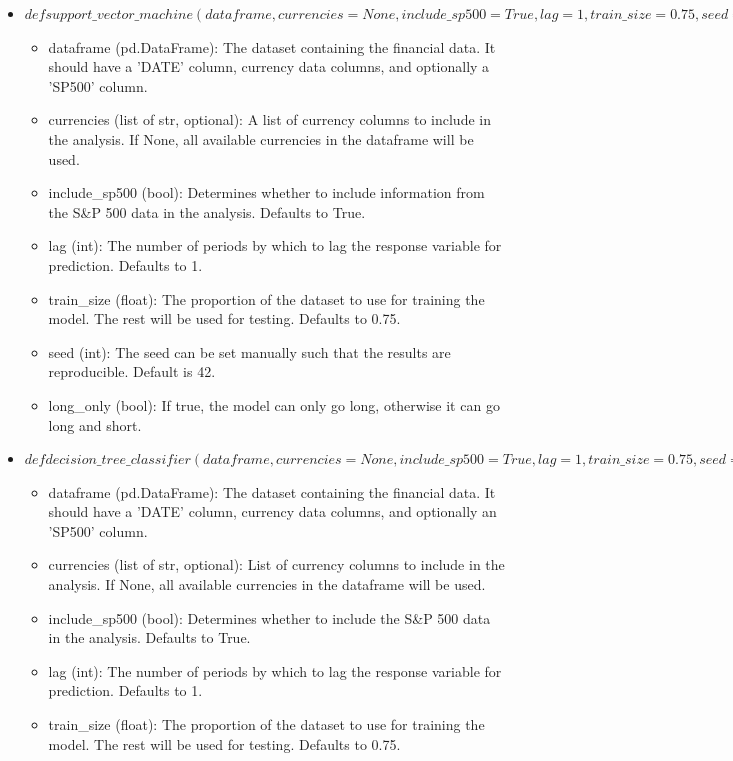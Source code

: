 \begin{itemize}
    \item $def support\_vector\_machine(dataframe, currencies=None, include\_sp500=True,lag=1, train\_size=0.75, seed=42, long\_only=False):$
    \begin{itemize}
        \item dataframe (pd.DataFrame): The dataset containing the financial data. It should have a 'DATE' column, currency data columns, and optionally a 'SP500' column.
        \item currencies (list of str, optional): A list of currency columns to include in the analysis. If None, all available currencies in the dataframe will be used.
        \item include\_sp500 (bool): Determines whether to include information from the S\&P 500 data in the analysis. Defaults to True.
        \item lag (int): The number of periods by which to lag the response variable for prediction. Defaults to 1.
        \item train\_size (float): The proportion of the dataset to use for training the model. The rest will be used for testing. Defaults to 0.75.
        \item seed (int): The seed can be set manually such that the results are reproducible. Default is 42.
        \item long\_only (bool): If true, the model can only go long, otherwise it can go long and short.
    \end{itemize}
    \item $def decision\_tree\_classifier(dataframe, currencies=None, include\_sp500=True, lag=1, train\_size=0.75, seed=42, long\_only=False, max\_depth=10):$
    \begin{itemize}
        \item dataframe (pd.DataFrame): The dataset containing the financial data. It should have a 'DATE' column, currency data columns, and optionally an 'SP500' column.
        \item currencies (list of str, optional): List of currency columns to include in the analysis. If None, all available currencies in the dataframe will be used.
        \item include\_sp500 (bool): Determines whether to include the S\&P 500 data in the analysis. Defaults to True.
        \item lag (int): The number of periods by which to lag the response variable for prediction. Defaults to 1.
        \item train\_size (float): The proportion of the dataset to use for training the model. The rest will be used for testing. Defaults to 0.75.

\end{itemize}
\end{itemize}
